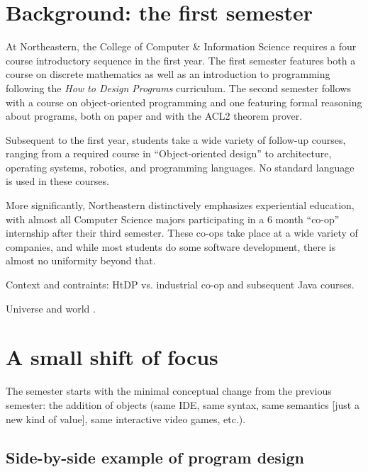 \documentclass[submission,copyright]{eptcs}
\begin{document}
\section{Background: the first semester}

At Northeastern, the College of Computer \& Information Science
requires a four course introductory sequence in the first year.  The
first semester features both a course on discrete mathematics as well
as an introduction to programming following the \emph{How to Design
  Programs} curriculum.  The second semester follows with a course on
object-oriented programming and one featuring formal reasoning about
programs, both on paper and with the ACL2 theorem prover.  

Subsequent to the first year, students take a wide variety of
follow-up courses, ranging from a required course in ``Object-oriented
design'' to architecture, operating systems, robotics, and programming
languages.  No standard language is used in these courses.  

More significantly, Northeastern distinctively emphasizes experiential
education, with almost all Computer Science majors participating in a
6 month ``co-op'' internship after their third semester.  These co-ops
take place at a wide variety of companies, and while most students do
some software development, there is almost no uniformity beyond that.  

Context and contraints: HtDP vs. industrial co-op and subsequent Java courses.

Universe and world \cite{dvanhorn:Felleisen2009Functional}.

\cite{dvanhorn:Felleisen2004Structure}

\cite{dvanhorn:Findler2002DrScheme}

\cite{dvanhorn:Felleisen2001How}

\section{A small shift of focus}

The semester starts with the minimal conceptual change from the
previous semester: the addition of objects (same IDE, same syntax,
same semantics [just a new kind of value], same interactive video
games, etc.).

\subsection{Side-by-side example of program design}
\end{document}
